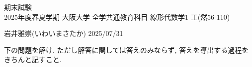 \documentclass[dvipdfmx,a4paper,11pt]{article}
\theoremstyle{definition}
\begin{document}
\pagestyle{empty}



\begin{center}
{\LARGE 期末試験} \\

{2025年度春夏学期 大阪大学 全学共通教育科目 線形代数学1 工(然56-110)}
\end{center}

\begin{flushright}
 岩井雅崇(いわいまさたか) 2025/07/31
\end{flushright}



  
  \begin{center}
下の問題を解け.  ただし解答に関しては答えのみならず, 答えを導出する過程をきちんと記すこと. 
  \end{center}
  
\end{document}
